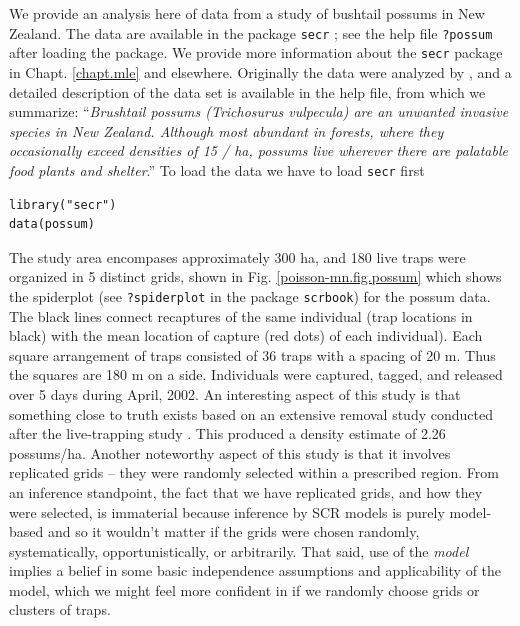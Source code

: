 We provide an analysis here of data from a study of bushtail possums
in New Zealand. The data are available in the \R package \mbox{\tt secr}
\citep{efford_etal:2009euring};
see the help file \mbox{\tt ?possum} after loading the \secr package.
We provide more information about the \mbox{\tt secr} package in
Chapt. \ref{chapt.mle} and elsewhere.
Originally the data were analyzed by \citet{efford_etal:2005}, and
a detailed description of the data set is available in the help file,
from which we summarize:
``{\it Brushtail possums (Trichosurus vulpecula) are an unwanted invasive
species in New Zealand. Although most abundant in forests, where they
occasionally exceed densities of 15 / ha, possums live wherever there
are palatable food plants and shelter}.''
To load the data we have to load \mbox{\tt secr} first
\begin{verbatim}
library("secr")
data(possum)
\end{verbatim}
The study area encompases approximately 300 ha, and 180 live traps
were
organized in 5 distinct grids, shown in  Fig. \ref{poisson-mn.fig.possum}
which shows the spiderplot (see \mbox{\tt ?spiderplot} in the \R
package \mbox{\tt scrbook}) for the possum data. The black lines
connect recaptures of the same individual (trap locations in black)
with the mean location of capture (red dots) of each individual).
Each square arrangement of traps consisted of
36 traps with a spacing of 20 m. Thus the squares are 180 m on a
side.
Individuals were captured, tagged, and released over 5 days during
April, 2002. An interesting aspect of this study is that something
close to truth exists based on an extensive removal study
conducted after the live-trapping study \citep{efford_etal:2005}. This
produced a density estimate of 2.26 possums/ha.  Another noteworthy
aspect of this study is that it involves
replicated grids -- they were randomly selected within a prescribed
region.
From an inference standpoint, the fact that we have replicated grids,
and how they were selected, is
immaterial because inference by SCR models is purely
model-based and so it wouldn't matter if the grids were chosen
randomly, systematically, opportunistically, or arbitrarily. That
said, use of the {\it model} implies a belief in some basic
independence
assumptions and applicability of the model, which we might
feel more confident in if we randomly choose grids or clusters of traps.
